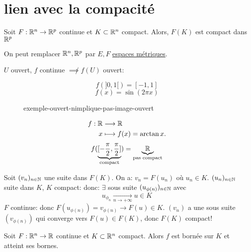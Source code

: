 \section{lien avec la compacité}
\begin{theorem}
    Soit $F: \mathbb{R}^n \to \mathbb{R}^p$ continue et $K \subset \mathbb{R}^n$ compact. Alors, $F(K)$ est compact dans  $\mathbb{R}^p$
\end{theorem}
\begin{remark}
    On peut remplacer $\mathbb{R}^n, \mathbb{R}^p$ par $E, F$ \underline{espaces métriques}.
\end{remark}
\begin{remark}
   $U$ ouvert,  $f$ continue $\not\implies f(U)$ ouvert:
\end{remark}
\begin{eg}
   \[
       f(]0, 1[) = [-1, 1]
   \]  
   \[
   f(x) = \sin(2\pi x)
   \] 
\begin{figure}[H]
    \centering
    \caption{exemple-ouvert-nimplique-pas-image-ouvert}
    \label{fig:exemple-ouvert-nimplique-pas-image-ouvert}
\end{figure}
\end{eg}
\begin{eg}
   \begin{align*}
       f: \mathbb{R} &\longrightarrow \mathbb{R} \\
       x &\longmapsto f(x) = \arctan x
   .\end{align*} 
   \[
       f(\underbrace{[-\frac{\pi}{2}, \frac{\pi}{2}]}_{\text{compact}}) = \underbrace{\mathbb{R}}_{\text{pas compact}}
   \] 
\end{eg}
\begin{preuve}
    Soit $(v_n)_{n \in \mathbb{N}}$ une suite dans $F(K)$. On a:  $v_n = F(u_n)$ où  $u_n \in K$.  $(u_n)_{n \in \mathbb{N}}$ suite dans $K$,  $K$ compact: donc:  $\exists$ sous suite $(u_{\phi(n)})_{n \in \mathbb{N}}$ avec 
    \[
        u_{\phi_n} \xrightarrow[n \to +\infty]{} u \in K
    \] 
    $F$ continue: donc  $F(u_{\phi(n)}) = v_{\phi(n)} \to F(u) \in K$. $(v_n)$ a une sous suite  $(v_{\phi(n)})$ qui converge vers $F(u) \in F(K)$, donc $F(K)$ compact!
\end{preuve}
\begin{theorem}
    Soit $F: \mathbb{R}^n \to \mathbb{R}$ continue et $K \subset \mathbb{R}^n$ compact. Alors $f$ est bornée sur  $K$ et atteint ses bornes. 
\end{theorem}
